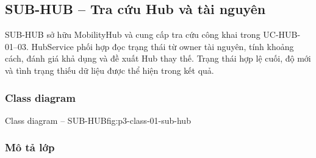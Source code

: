 \par\medskip
\noindent\begin{minipage}{\linewidth}
\subsection{SUB-HUB -- Tra cứu Hub và tài nguyên}
SUB-HUB sở hữu MobilityHub và cung cấp tra cứu công khai trong UC-HUB-01--03. HubService phối hợp đọc trạng thái từ owner tài nguyên, tính khoảng cách, đánh giá khả dụng và đề xuất Hub thay thế. Trạng thái hợp lệ cuối, độ mới và tình trạng thiếu dữ liệu được thể hiện trong kết quả.

\subsubsection{Class diagram}
{Class diagram -- SUB-HUB}{fig:p3-class-01-sub-hub}
\end{minipage}\par


\subsubsection{Mô tả lớp}

